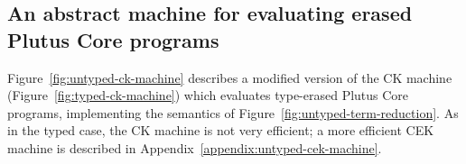 \documentclass[a4paper]{article}
\begin{document}


\subsection{An abstract machine for evaluating erased Plutus Core programs}
\label{sec:untyped-ck-machine}
Figure~\ref{fig:untyped-ck-machine} describes a modified version of
the CK machine (Figure~\ref{fig:typed-ck-machine}) which evaluates
type-erased Plutus Core programs, implementing the semantics of
Figure~\ref{fig:untyped-term-reduction}. As in the typed case, the CK
machine is not very efficient; a more efficient CEK machine is
described in Appendix~\ref{appendix:untyped-cek-machine}.




\end{document}
